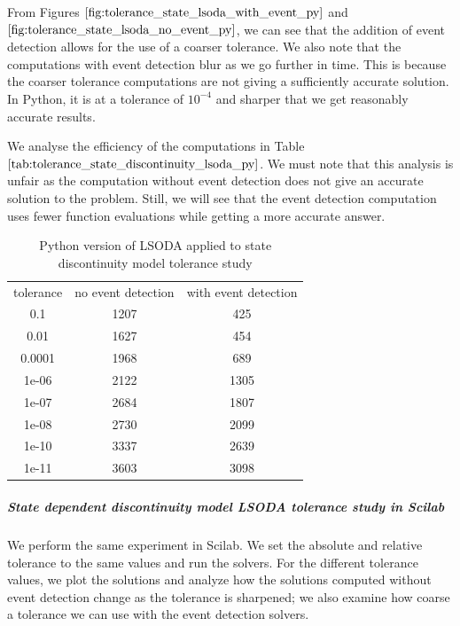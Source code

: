 From Figures $\ref{fig:tolerance_state_lsoda_with_event_py}$ and $\ref{fig:tolerance_state_lsoda_no_event_py}$, we can see that the addition of event detection allows for the use of a coarser tolerance. We also note that the computations with event detection blur as we go further in time. This is because the coarser tolerance computations are not giving a sufficiently accurate solution. In Python, it is at a tolerance of $10^{-4}$ and sharper that we get reasonably accurate results. 

We analyse the efficiency of the computations in Table $\ref{tab:tolerance_state_discontinuity_lsoda_py}$. We must note that this analysis is unfair as the computation without event detection does not give an accurate solution to the problem. Still, we will see that the event detection computation uses fewer function evaluations while getting a more accurate answer.

\begin{table}[h]
\caption {Python version of LSODA applied to state discontinuity model tolerance study} \label{tab:tolerance_state_discontinuity_lsoda_py} 
\begin{center}
\begin{tabular}{ c c c }
tolerance & no event detection & with event detection \\
0.1 & 1207 & 425 \\
0.01 & 1627 & 454 \\
0.0001 & 1968 & 689 \\
1e-06 & 2122 & 1305 \\
1e-07 & 2684 & 1807 \\
1e-08 & 2730 & 2099 \\
1e-10 & 3337 & 2639 \\
1e-11 & 3603 & 3098 \\
\end{tabular}
\end{center}
\end{table}

\subparagraph{State dependent discontinuity model LSODA tolerance study in Scilab}

We perform the same experiment in Scilab. We set the absolute and relative tolerance to the same values and run the solvers. For the different tolerance values, we plot the solutions and analyze how the solutions computed without event detection change as the tolerance is sharpened; we also examine how coarse a tolerance we can use with the event detection solvers.

